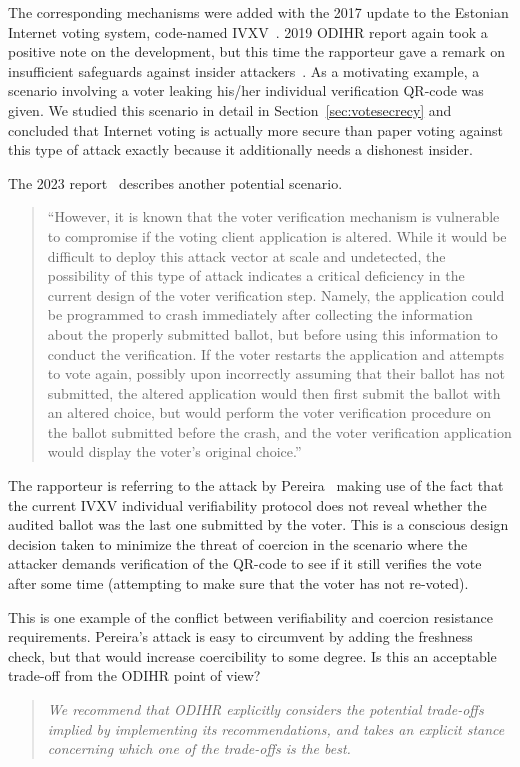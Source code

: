 \documentclass{llncs}
\begin{document}
The corresponding mechanisms were added with the 2017 update to the Estonian Internet voting system, code-named IVXV~\cite{DBLP:conf/voteid/HeibergMVW16,EHIN2022101718}. 2019 ODIHR report again took a positive note on the development, but this time the rapporteur gave a remark on insufficient safeguards against insider attackers~\cite{ODIHR2019}. As a motivating example, a scenario involving a voter leaking his/her individual verification QR-code was given. We studied this scenario in detail in Section~\ref{sec:votesecrecy} and concluded that Internet voting is actually more secure than paper voting against this type of attack exactly because it additionally needs a dishonest insider.

The 2023 report~\cite{ODIHR2023} describes another potential scenario.
\begin{quote}
    ``However, it is known that the voter verification mechanism is vulnerable to compromise if the voting client application is altered. While it would be difficult to deploy this attack vector at scale and undetected, the possibility of this type of attack indicates a critical deficiency in the current design of the voter verification step. Namely, the application could be programmed to crash immediately after collecting the information about the properly submitted ballot, but before using this information to conduct the verification. If the voter restarts the application and attempts to vote again, possibly upon incorrectly assuming that their ballot has not submitted, the altered application would then first submit the ballot with an altered choice, but would perform the voter verification procedure on the ballot submitted before the crash, and the voter verification application would display the voter's original choice.''
\end{quote}

The rapporteur is referring to the attack by Pereira~\cite{DBLP:conf/fc/Pereira22} making use of the fact that the current IVXV individual verifiability protocol does not reveal whether the audited ballot was the last one submitted by the voter. This is a conscious design decision taken to minimize the threat of coercion in the scenario where the attacker demands verification of the QR-code to see if it still verifies the vote after some time (attempting to make sure that the voter has not re-voted). 

This is one example of the conflict between verifiability and coercion resistance requirements. Pereira's attack is easy to circumvent by adding the freshness check, but that would increase coercibility to some degree. Is this an acceptable trade-off from the ODIHR point of view?
\begin{quote}
    \emph{We recommend that ODIHR explicitly considers the potential trade-offs implied by implementing its recommendations, and takes an explicit stance concerning which one of the trade-offs is the best.}
\end{quote}
\end{document}
